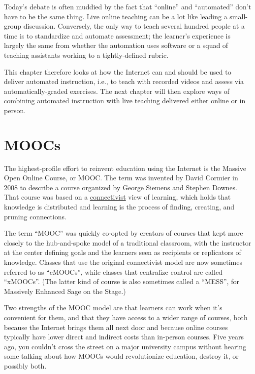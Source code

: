 Today's debate is often muddied by the fact that ``online'' and
``automated'' don't have to be the same thing. Live online teaching
can be a lot like leading a small-group discussion. Conversely, the only
way to teach several hundred people at a time is to standardize and
automate assessment; the learner's experience is largely the same from
whether the automation uses software or a squad of teaching assistants
working to a tightly-defined rubric.

This chapter therefore looks at how the Internet can and should be used
to deliver automated instruction, i.e., to teach with recorded videos
and assess via automatically-graded exercises. The next chapter will
then explore ways of combining automated instruction with live teaching
delivered either online or in person.

\section{MOOCs}\label{s:online-moocs}

The highest-profile effort to reinvent education using the Internet is
the Massive Open Online Course, or MOOC. The term was invented by
David Cormier in 2008 to describe a course organized by George Siemens
and Stephen Downes. That course was based on a
\protect\hyperlink{g:connectivism}{connectivist} view of learning, which holds that
knowledge is distributed and learning is the process of finding,
creating, and pruning connections.

The term ``MOOC'' was quickly co-opted by creators of courses that kept
more closely to the hub-and-spoke model of a traditional classroom, with
the instructor at the center defining goals and the learners seen as
recipients or replicators of knowledge. Classes that use the original
connectivist model are now sometimes referred to as ``cMOOCs'', while
classes that centralize control are called ``xMOOCs''. (The latter kind of
course is also sometimes called a ``MESS'', for Massively Enhanced Sage on
the Stage.)

Two strengths of the MOOC model are that learners can work when it's
convenient for them, and that they have access to a wider range of
courses, both because the Internet brings them all next door and because
online courses typically have lower direct and indirect costs than
in-person courses. Five years ago, you couldn't cross the street on a
major university campus without hearing some talking about how MOOCs
would revolutionize education, destroy it, or possibly both.

